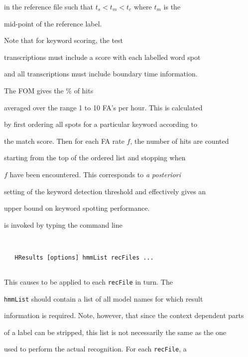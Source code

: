 in the reference file such that $t_s < t_m < t_e$ where $t_m$ is the


mid-point of the reference label.





Note that for keyword scoring, the test


transcriptions must include a score with each labelled word spot


and all transcriptions must include boundary time information.





The FOM gives the \% of hits


averaged over the range 1 to 10 FA's per hour.  This is calculated


by first ordering all spots for a particular keyword according to


the match score.  Then for each FA rate $f$, the number of hits are counted


starting from the top of the ordered list and stopping when 


$f$ have been encountered.  This corresponds to \textit{a posteriori}


setting of the keyword detection threshold and effectively gives an


upper bound on keyword spotting performance.










 is invoked by typing the command line


\begin{verbatim}


   HResults [options] hmmList recFiles ...


\end{verbatim}


This causes  to be applied to each {\tt recFile} in turn.  The


{\tt hmmList} should contain a list of all model names for which result


information is required.  Note, however, that since the context dependent parts


of a label can be stripped, this list is not necessarily the same as the one


used to perform the actual recognition.  For each {\tt recFile}, a


